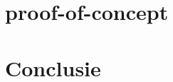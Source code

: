 
\chapter{proof-of-concept}%
\label{ch:proof-of-concept}













\chapter{Conclusie}%
\label{ch:conclusie}


\lipsum[76-80]

